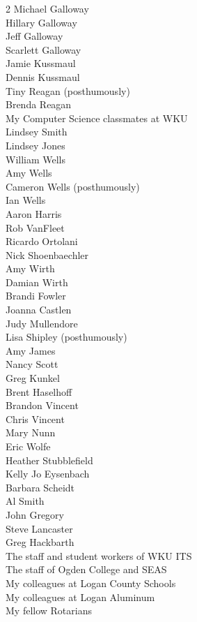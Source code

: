 \begin{multicols}{2}
        Michael Galloway \\
        Hillary Galloway \\
        Jeff Galloway \\
        Scarlett Galloway \\
        Jamie Kussmaul \\
        Dennis Kussmaul \\
        Tiny Reagan (posthumously) \\
        Brenda Reagan \\
        My Computer Science classmates at WKU \\
        Lindsey Smith \\
        Lindsey Jones \\
        William Wells \\
        Amy Wells \\
        Cameron Wells (posthumously) \\
        Ian Wells \\
        Aaron Harris \\
        Rob VanFleet \\
        Ricardo Ortolani \\
        Nick Shoenbaechler \\
        Amy Wirth \\
        Damian Wirth \\
        Brandi Fowler \\
        Joanna Castlen \\
        Judy Mullendore \\
        Lisa Shipley (posthumously) \\
        Amy James \\
        Nancy Scott \\
        Greg Kunkel \\
        Brent Haselhoff \\
        Brandon Vincent \\
        Chris Vincent \\
        Mary Nunn \\
        Eric Wolfe \\
        Heather Stubblefield \\
        Kelly Jo Eysenbach \\
        Barbara Scheidt \\
        Al Smith \\
        John Gregory \\
        Steve Lancaster \\
        Greg Hackbarth \\
        The staff and student workers of WKU ITS \\
        The staff of Ogden College and SEAS \\
        My colleagues at Logan County Schools \\
        My colleagues at Logan Aluminum \\
        My fellow Rotarians
    \end{multicols}

